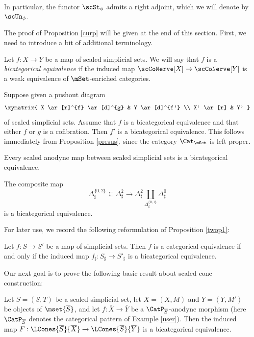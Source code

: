 In particular, the functor $\scSt_{\phi}$ admits a right adjoint, which we will denote by
$\scUn_{\phi}$.

The proof of Proposition \ref{curp} will be given at the end of this section. First, we need to
introduce a bit of additional terminology.

\begin{definition}\label{bicateq}
Let $f: X \rightarrow Y$ be a map of scaled simplicial sets. We will say that
$f$ is a {\it bicategorical equivalence} if the induced map $\scCoNerve[X] \rightarrow \scCoNerve[Y]$ is a weak equivalence of $\mSet$-enriched categories.
\end{definition}

\begin{remark}\label{suskp}
Suppose given a pushout diagram
$$ \xymatrix{ X \ar[r]^{f} \ar[d]^{g} & Y \ar[d]^{f'} \\
X' \ar[r] & Y' }$$
of scaled simplicial sets. Assume that $f$ is a bicategorical equivalence and that either
$f$ or $g$ is a cofibration. Then $f'$ is a bicategorical equivalence. This follows immediately
from Proposition \ref{presus}, since the category $\Cat_{\mSet}$ is left-proper.
\end{remark}

\begin{remark}\label{ilkk}
Every scaled anodyne map between scaled simplicial sets is a bicategorical equivalence.
\end{remark}

\begin{example}\label{swisher}
The composite map
$$ \Delta^{ \{0,2\} }_{\sharp} \subseteq \Delta^2_{\sharp} \rightarrow
\Delta^2_{\sharp} \coprod_{ \Delta^{ \{0,1\}}_{\sharp} } \Delta^0_{\sharp}$$
is a bicategorical equivalence.
\end{example}

For later use, we record the following reformulation of Proposition \ref{twop1}:

\begin{proposition}\label{twop2}
Let $f: S \rightarrow S'$ be a map of simplicial sets. Then $f$ is a categorical equivalence if and only if the induced map $f_{\sharp}: S_{\sharp} \rightarrow S'_{\sharp}$ is a bicategorical equivalence.
\end{proposition}

Our next goal is to prove the following basic result about scaled cone construction:

\begin{proposition}\label{coop}
Let $\overline{S} = (S,T)$ be a scaled simplicial set, let $\overline{X} = (X, M)$ and
$\overline{Y} = (Y,M')$ be objects of $\mset{\overline{S}}$, and let $f: \overline{X} \rightarrow \overline{Y}$ be a $\CatP_{\overline{S}}$-anodyne morphism (here $\CatP_{\overline{S}}$ denotes the categorical
pattern of Example \ref{user}). Then the induced map
$F: \LCones{\overline{S}}{\overline{X}} \rightarrow \LCones{ \overline{S}}{\overline{Y}}$ is
a bicategorical equivalence.
\end{proposition}

